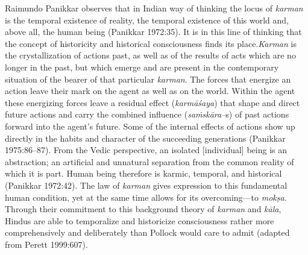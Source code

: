 Raimundo Panikkar observes that in Indian way of thinking the locus of \textit{karman} is the temporal existence of reality, the temporal existence of this world and, above all, the human being (Panikkar 1972:35). It is in this line of thinking that the concept of historicity and historical consciousness finds its place.\textit{Karman} is the crystallization of actions past, as well as of the results of acts which are no longer in the past, but which emerge and are present in the contemporary situation of the bearer of that particular \textit{karman}. The forces that energize an action leave their mark on the agent as well as on the world. Within the agent these energizing forces leave a residual effect (\textit{karmāśaya}) that shape and direct future actions and carry the combined influence (\textit{saṁskāra–}s) of past actions forward into the agent's future. Some of the internal effects of actions show up directly in the habits and character of the succeeding generations (Panikkar 1975:86–87). From the Vedic perspective, an isolated [individual] being is an abstraction; an artificial and unnatural separation from the common reality of which it is part. Human being therefore is karmic, temporal, and historical (Panikkar 1972:42). The law of \textit{karman} gives expression to this fundamental human condition, yet at the same time allows for its overcoming—to \textit{mokṣa}. Through their commitment to this background theory of \textit{karman} and \textit{kāla}, Hindus are able to temporalize and historicize consciousness rather more comprehensively and deliberately than Pollock would care to admit (adapted from Perett 1999:607).


